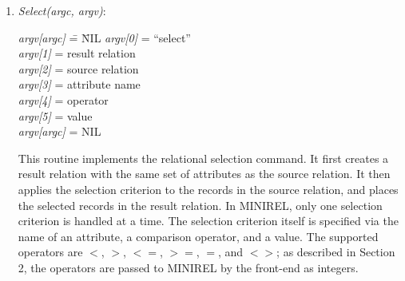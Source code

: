 \begin{enumerate}
\item\emph{Select(argc, argv)}:
\begin{tabbing}
\hspace*{0.2in}\emph{argv[argc]} \= = \= NIL              \kill
\hspace*{0.2in}\emph{argv[0]}    \> = \> ``select''       \\
\hspace*{0.2in}\emph{argv[1]}    \> = \> result relation  \\
\hspace*{0.2in}\emph{argv[2]}    \> = \> source relation  \\
\hspace*{0.2in}\emph{argv[3]}    \> = \> attribute name   \\
\hspace*{0.2in}\emph{argv[4]}    \> = \> operator         \\
\hspace*{0.2in}\emph{argv[5]}    \> = \> value            \\
\hspace*{0.2in}\emph{argv[argc]} \> = \> NIL
\end{tabbing}

This routine implements the relational selection command.  It first
creates a result relation with the same set of attributes as the source
relation.  It then applies the selection criterion to the records in
the source relation, and places the selected records in the result
relation.  In MINIREL, only one selection criterion is handled at a
time.  The selection criterion itself is specified via the name of an
attribute, a comparison operator, and a value.  The supported operators
are {\bf $<$\/}, {\bf $>$\/}, {\bf $<=$\/}, {\bf $>=$\/}, {\bf $=$\/},
and {\bf $<>$\/}; as described in Section 2, the operators are passed
to MINIREL by the front-end as integers.



\end{enumerate}
